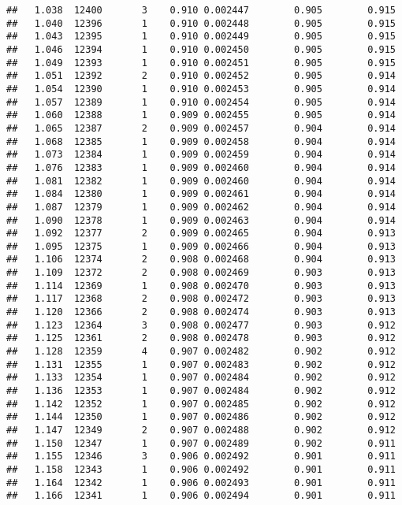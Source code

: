 \documentclass[
]{book}
\begin{document}
\begin{verbatim}
##   1.038  12400       3    0.910 0.002447        0.905        0.915
##   1.040  12396       1    0.910 0.002448        0.905        0.915
##   1.043  12395       1    0.910 0.002449        0.905        0.915
##   1.046  12394       1    0.910 0.002450        0.905        0.915
##   1.049  12393       1    0.910 0.002451        0.905        0.915
##   1.051  12392       2    0.910 0.002452        0.905        0.914
##   1.054  12390       1    0.910 0.002453        0.905        0.914
##   1.057  12389       1    0.910 0.002454        0.905        0.914
##   1.060  12388       1    0.909 0.002455        0.905        0.914
##   1.065  12387       2    0.909 0.002457        0.904        0.914
##   1.068  12385       1    0.909 0.002458        0.904        0.914
##   1.073  12384       1    0.909 0.002459        0.904        0.914
##   1.076  12383       1    0.909 0.002460        0.904        0.914
##   1.081  12382       1    0.909 0.002460        0.904        0.914
##   1.084  12380       1    0.909 0.002461        0.904        0.914
##   1.087  12379       1    0.909 0.002462        0.904        0.914
##   1.090  12378       1    0.909 0.002463        0.904        0.914
##   1.092  12377       2    0.909 0.002465        0.904        0.913
##   1.095  12375       1    0.909 0.002466        0.904        0.913
##   1.106  12374       2    0.908 0.002468        0.904        0.913
##   1.109  12372       2    0.908 0.002469        0.903        0.913
##   1.114  12369       1    0.908 0.002470        0.903        0.913
##   1.117  12368       2    0.908 0.002472        0.903        0.913
##   1.120  12366       2    0.908 0.002474        0.903        0.913
##   1.123  12364       3    0.908 0.002477        0.903        0.912
##   1.125  12361       2    0.908 0.002478        0.903        0.912
##   1.128  12359       4    0.907 0.002482        0.902        0.912
##   1.131  12355       1    0.907 0.002483        0.902        0.912
##   1.133  12354       1    0.907 0.002484        0.902        0.912
##   1.136  12353       1    0.907 0.002484        0.902        0.912
##   1.142  12352       1    0.907 0.002485        0.902        0.912
##   1.144  12350       1    0.907 0.002486        0.902        0.912
##   1.147  12349       2    0.907 0.002488        0.902        0.912
##   1.150  12347       1    0.907 0.002489        0.902        0.911
##   1.155  12346       3    0.906 0.002492        0.901        0.911
##   1.158  12343       1    0.906 0.002492        0.901        0.911
##   1.164  12342       1    0.906 0.002493        0.901        0.911
##   1.166  12341       1    0.906 0.002494        0.901        0.911

\end{verbatim}
\end{document}
